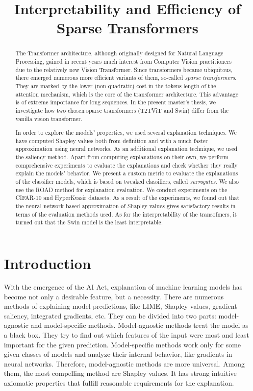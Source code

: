 \documentclass[en]{pracamgr}
\title{Interpretability and Efficiency of Sparse Transformers}
\begin{document}
\maketitle

\begin{abstract}
The Transformer architecture, although originally designed for Natural Language Processing, gained in recent years much interest from Computer Vision practitioners due to the relatively new Vision Transformer. Since transformers became ubiquitous, there emerged numerous more efficient variants of them, so-called \emph{sparse transformers}. They are marked by the lower (non-quadratic) cost in the tokens length of the attention mechanism, which is the core of the transformer architecture. This advantage is of extreme importance for long sequences. In the present master's thesis, we investigate how two chosen sparse transformers (T2T\textunderscore ViT and Swin) differ from the vanilla vision transformer.

In order to explore the models' properties, we used several explanation techniques. We have computed Shapley values both from definition and with a much faster approximation using neural networks. As an additional explanation technique, we used the saliency method. Apart from computing explanations on their own, we perform comprehensive experiments to evaluate the explanations and check whether they really explain the models' behavior. We present a custom metric to evaluate the explanations of the classifier models, which is based on tweaked classifiers, called \emph{surrogates}. We also use the ROAD method for explanation evaluation. We conduct experiments on the CIFAR-10 and HyperKvasir datasets.
As a result of the experiments, we found out that the neural network-based approximation of Shapley values gives satisfactory results in terms of the evaluation methods used. As for the interpretability of the transofmers, it turned out that the Swin model is the least interpretable.
\end{abstract}

\tableofcontents

\chapter*{Introduction}
With the emergence of the AI Act, explanation of machine learning models has become not only a desirable feature, but a necessity. There are numerous methods of explaining model predictions, like LIME, Shapley values, gradient saliency, integrated gradients, etc. They can be divided into two parts: model-agnostic and model-specific methods. Model-agnostic methods treat the model as a black box. They try to find out which features of the input were most and least important for the given prediction. Model-specific methods work only for some given classes of models and analyze their internal behavior, like gradients in neural networks.
Therefore, model-agnostic methods are more universal. Among them, the most compelling method are Shapley values. It has strong intuitive axiomatic properties that fulfill reasonable requirements for the explanation.
\end{document}
